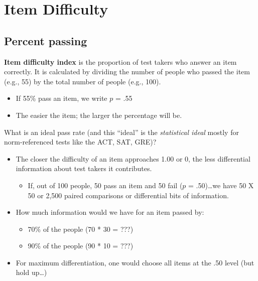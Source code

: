 \documentclass[
  english,
]{book}
\providecommand{\tightlist}{%
  \setlength{\itemsep}{0pt}\setlength{\parskip}{0pt}}
\begin{document}
\hypertarget{item-difficulty}{%
\section{Item Difficulty}\label{item-difficulty}}

\hypertarget{percent-passing}{%
\subsection{Percent passing}\label{percent-passing}}

\textbf{Item difficulty index} is the proportion of test takers who answer an item correctly. It is calculated by dividing the number of people who passed the item (e.g., 55) by the total number of people (e.g., 100).

\begin{itemize}
\tightlist
\item
  If 55\% pass an item, we write \(p\) = .55
\item
  The easier the item; the larger the percentage will be.
\end{itemize}

What is an ideal pass rate (and this ``ideal'' is the \emph{statistical ideal} mostly for norm-referenced tests like the ACT, SAT, GRE)?

\begin{itemize}
\tightlist
\item
  The closer the difficulty of an item approaches 1.00 or 0, the less differential information about test takers it contributes.

  \begin{itemize}
  \tightlist
  \item
    If, out of 100 people, 50 pass an item and 50 fail (\(p\) = .50)\ldots we have 50 X 50 or 2,500 paired comparisons or differential bits of information.
  \end{itemize}
\item
  How much information would we have for an item passed by:

  \begin{itemize}
  \tightlist
  \item
    70\% of the people (70 * 30 = ???)
  \item
    90\% of the people (90 * 10 = ???)
  \end{itemize}
\item
  For maximum differentiation, one would choose all items at the .50 level (but hold up\ldots)
\end{itemize}
\end{document}
